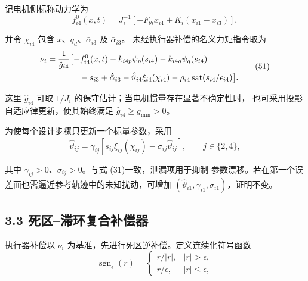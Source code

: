 \documentclass{article}
\begin{document}
记电机侧标称动力学为
\begin{equation}
 f_{i4}^{0}(x,t)=J_i^{-1}\left[-F_{\theta i}x_{i4}
 +K_i(x_{i1}-x_{i3})\right],

 \tag{50}
\label{eq:f_i4_nominal}
\end{equation}

并令 $\chi_{i4}$ 包含 $x$、$q_d$、$\bar\alpha_{i3}$ 及 $\dot{\bar\alpha}_{i3}$。
未经执行器补偿的名义力矩指令取为
\begin{equation}
\begin{aligned}
 \nu_i={}&\frac{1}{\hat g_{i4}}
 \bigl[-f_{i4}^{0}(x,t)-k_{i4p}\psi_p(s_{i4})
 -k_{i4q}\psi_q(s_{i4})\\
 &\hspace{9mm}-s_{i3}+\dot{\bar\alpha}_{i3}
 -\hat\vartheta_{i4}\xi_{i4}(\chi_{i4})
 -\rho_{i4}\operatorname{sat}(s_{i4}/\epsilon_{i4})\bigr].
\end{aligned}

 \tag{51}
\label{eq:nominal_torque}
\end{equation}

这里 $\hat g_{i4}$ 可取 $1/J_i$ 的保守估计；当电机惯量存在显著不确定性时，
也可采用投影自适应律更新，使其始终满足 $\hat g_{i4}\geq g_{\min}>0$。

为使每个设计步骤只更新一个标量参数，采用
\begin{equation}
 \dot{\hat\vartheta}_{ij}=\gamma_{ij}\left[
 s_{ij}\xi_{ij}(\chi_{ij})-\sigma_{ij}\hat\vartheta_{ij}\right],
 \qquad j\in\{2,4\},

 \tag{52}
\label{eq:adaptation_law}
\end{equation}

其中 $\gamma_{ij}>0$、$\sigma_{ij}>0$。与式 (31)一致，泄漏项用于抑制
参数漂移。若在第一个误差面也需逼近参考轨迹中的未知扰动，可增加
$(\hat\vartheta_{i1},\gamma_{i1},\sigma_{i1})$，证明不变。

\subsection{3.3 死区--滞环复合补偿器}
\label{subsec:actuator_compensation}

执行器补偿以 $\nu_i$ 为基准，先进行死区逆补偿。定义连续化符号函数
\begin{equation}
 \operatorname{sgn}_{\epsilon}(r)=
 \begin{cases}r/|r|,& |r|>\epsilon,\\ r/\epsilon,& |r|\leq\epsilon,\end{cases}

 \tag{53}
\label{eq:continuous_sign}
\end{equation}
\end{document}
